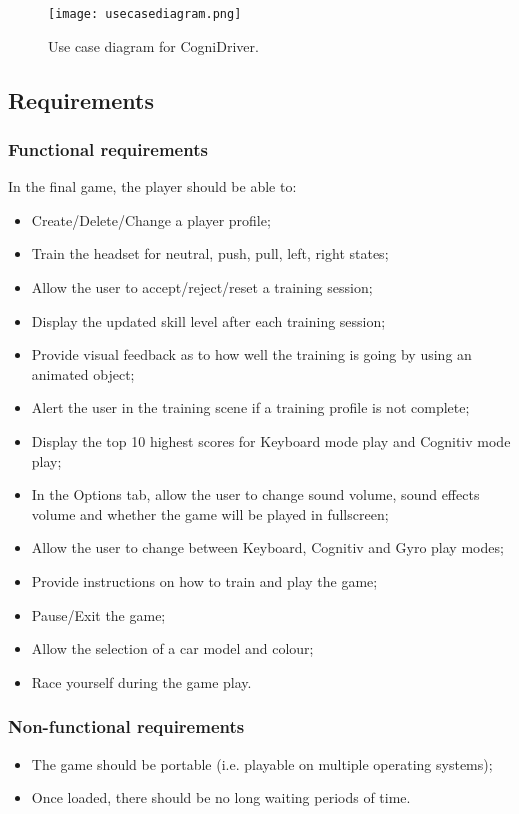 \begin{figure}
  \centering
  \texttt{[image: usecasediagram.png]}
  \caption{Use case diagram for CogniDriver.}
    \label{fig:useCaseDiagram}           
\end{figure}

\subsection{Requirements}

\subsubsection{Functional requirements}
In the final game, the player should be able to: 
\begin{itemize}
	\item Create/Delete/Change a player profile;
	\item Train the headset for neutral, push, pull, left, right states;
	\item Allow the user to accept/reject/reset a training session;
	\item Display the updated skill level after each training session;
	\item Provide visual feedback as to how well the training is going by using an animated object;
	\item Alert the user in the training scene if a training profile is not complete;
	\item Display the top 10 highest scores for Keyboard mode play and Cognitiv mode play;
	\item In the Options tab, allow the user to change sound volume, sound effects volume and whether the game will be played in fullscreen;
	\item Allow the user to change between Keyboard, Cognitiv and Gyro play modes;
	\item Provide instructions on how to train and play the game;
	\item Pause/Exit the game;
	\item Allow the selection of a car model and colour;
	\item Race yourself during the game play.
\end{itemize}

\subsubsection{Non-functional requirements}
\begin{itemize}
	\item The game should be portable (i.e. playable on multiple operating systems);
	\item Once loaded, there should be no long waiting periods of time.
\end{itemize}

